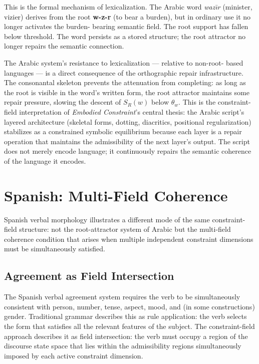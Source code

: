 \documentclass[11pt, a4paper]{article}
\theoremstyle{definition}
\theoremstyle{remark}
\begin{document}
This is the formal mechanism of lexicalization. The Arabic word
\textit{waz{\=\i}r} (minister, vizier) derives from the root \textbf{w-z-r}
(to bear a burden), but in ordinary use it no longer activates the burden-
bearing semantic field. The root support has fallen below threshold. The word
persists as a stored structure; the root attractor no longer repairs the
semantic connection.

The Arabic system's resistance to lexicalization --- relative to non-root-
based languages --- is a direct consequence of the orthographic repair
infrastructure. The consonantal skeleton prevents the attenuation from
completing: as long as the root is visible in the word's written form, the
root attractor maintains some repair pressure, slowing the descent of
$S_R(w)$ below $\theta_w$. This is the constraint-field interpretation of
\textit{Embodied Constraint}'s central thesis: the Arabic script's layered
architecture (skeletal forms, dotting, diacritics, positional regularization)
stabilizes as a constrained symbolic equilibrium because each layer is a
repair operation that maintains the admissibility of the next layer's output.
The script does not merely encode language; it continuously repairs the
semantic coherence of the language it encodes.

\section{Spanish: Multi-Field Coherence}

Spanish verbal morphology illustrates a different mode of the same constraint-
field structure: not the root-attractor system of Arabic but the multi-field
coherence condition that arises when multiple independent constraint dimensions
must be simultaneously satisfied.

\subsection{Agreement as Field Intersection}

The Spanish verbal agreement system requires the verb to be simultaneously
consistent with person, number, tense, aspect, mood, and (in some constructions)
gender. Traditional grammar describes this as rule application: the verb
selects the form that satisfies all the relevant features of the subject.
The constraint-field approach describes it as field intersection: the verb
must occupy a region of the discourse state space that lies within the
admissibility regions simultaneously imposed by each active constraint dimension.
\end{document}
